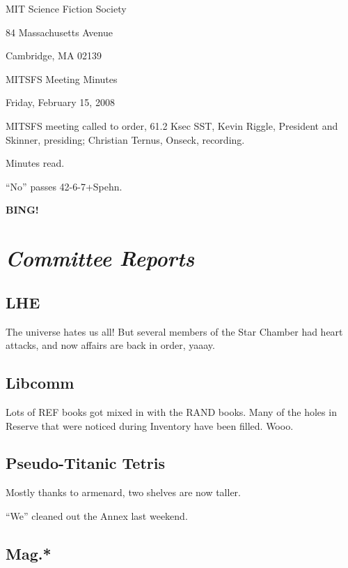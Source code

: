 \documentclass[10pt]{article}
\newcommand{\bing}{{\bf BING!} }
\newcommand{\goto}[1]{\bing \vskip 12pt \section*{{\em{#1}}}}
\begin{document}
\begin{center}

MIT Science Fiction Society

84 Massachusetts Avenue

Cambridge, MA 02139

\vspace{12pt}

MITSFS Meeting Minutes

Friday, February 15, 2008

\end{center}

\vspace{18pt}

\setlength{\parskip}{6pt}

\noindent
MITSFS meeting called to order, 61.2 Ksec SST,
Kevin Riggle, President and Skinner, presiding; Christian Ternus, Onseck, recording.

Minutes read.

``No'' passes 42-6-7+Spehn.

\BING

\goto{Committee Reports}

\subsection*{LHE}

The universe hates us all!  But several members of the Star Chamber had heart attacks, and now affairs are back in order, yaaay.

\subsection*{Libcomm}

Lots of REF books got mixed in with the RAND books.  Many of the holes in Reserve that were noticed during Inventory have been filled.  Wooo.

\subsection*{Pseudo-Titanic Tetris}

Mostly thanks to armenard, two shelves are now taller.

``We'' cleaned out the Annex last weekend.

\subsection*{Mag.*}
\end{document}
